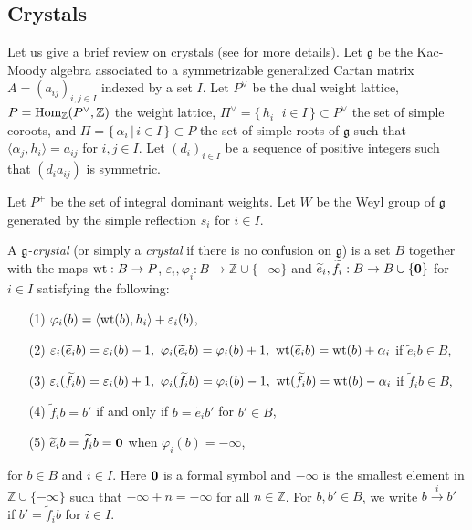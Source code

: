 \documentclass[leqno,11pt]{amsart}
\numberwithin{equation}{section}
\newcommand{\Z}{\mathbb{Z}}
\newcommand{\te}{\widetilde{e}}
\newcommand{\tf}{\widetilde{f}}
\newcommand{\g}{\mathfrak{g}}
\begin{document}
\subsection{Crystals}
Let us give a brief review on crystals (see \cite{HK,Kas95} for more details).
Let $\g$ be the Kac-Moody algebra associated to a symmetrizable generalized Cartan matrix
$A =(a_{ij})_{i,j\in I}$ indexed by a set $I$. Let $P^\vee$ be the dual weight lattice,
$P = {\rm Hom}_\Z( P^\vee,\Z)$ the weight lattice,
$\Pi^\vee=\{\,h_i\,|\,i\in I\,\}\subset P^\vee$ the set of simple coroots, and
$\Pi=\{\,\alpha_i\,|\,i\in I\,\}\subset P$ the set of simple roots of $\g$ such that $\langle \alpha_j,h_i\rangle=a_{ij}$ for $i,j\in I$. Let $(d_i)_{i\in I}$ be a sequence of positive integers such that $(d_ia_{ij})$ is symmetric.


Let $P^+$ be the set of integral dominant weights.
Let $W$ be the Weyl group of $\g$ generated by the simple reflection $s_i$ for $i\in I$.

A {\it $\g$-crystal} (or simply a {\it crystal} if there is no confusion on $\g$) is a set
$B$ together with the maps ${\rm wt} : B \rightarrow P$,
$\varepsilon_i, \varphi_i: B \rightarrow \mathbb{Z}\cup\{-\infty\}$ and
$\te_i, \tf_i: B \rightarrow B\cup\{{\bf 0}\}$ for $i\in I$ satisfying the following:
\begin{itemize}
\item[(1)]  
$\varphi_i(b) =\langle {\rm wt}(b),h_i \rangle +
\varepsilon_i(b)$,

\item[(2)] $\varepsilon_i(\te_i b) = \varepsilon_i(b) - 1,\ \varphi_i(\te_i b) =
\varphi_i(b) + 1,\ {\rm wt}(\te_ib)={\rm wt}(b)+\alpha_i$ if $\te_i b \in B$,

\item[(3)] $\varepsilon_i(\tf_i b) = \varepsilon_i(b) + 1,\ \varphi_i(\tf_i b) =
\varphi_i(b) - 1,\ {\rm wt}({\tf_i}b)={\rm wt}(b)-\alpha_i$ if $\tf_i b \in B$,

\item[(4)] $\tf_i b = b'$ if and only if $b = \te_i b'$ for $b' \in B$,

\item[(5)] $\te_ib=\tf_ib={\bf 0}$ when $\varphi_i(b)=-\infty$,
\end{itemize}
for $b\in B$ and $i\in I$.
Here ${\bf 0}$ is a formal symbol and $-\infty$ is the smallest
element in $\Z\cup\{-\infty\}$ such that $-\infty+n=-\infty$
for all $n\in\Z$. %
For $b, b'\in B$, we write $b\stackrel{i}{\rightarrow}b'$ if $b'=\tf_i b$ for $i\in I$.
\end{document}
